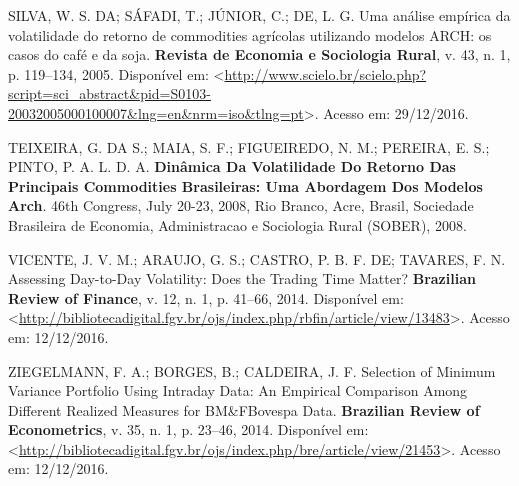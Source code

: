\documentclass[]{article}
\begin{document}
\hypertarget{ref-silva_uma_2005}{}
SILVA, W. S. DA; SÁFADI, T.; JÚNIOR, C.; DE, L. G. Uma análise empírica
da volatilidade do retorno de commodities agrícolas utilizando modelos
ARCH: os casos do café e da soja. \textbf{Revista de Economia e
Sociologia Rural}, v. 43, n. 1, p. 119--134, 2005. Disponível em:
\textless{}\url{http://www.scielo.br/scielo.php?script=sci_abstract\&pid=S0103-20032005000100007\&lng=en\&nrm=iso\&tlng=pt}\textgreater{}.
Acesso em: 29/12/2016.

\hypertarget{ref-teixeira_dinamica_2008}{}
TEIXEIRA, G. DA S.; MAIA, S. F.; FIGUEIREDO, N. M.; PEREIRA, E. S.;
PINTO, P. A. L. D. A. \textbf{Dinâmica Da Volatilidade Do Retorno Das
Principais Commodities Brasileiras: Uma Abordagem Dos Modelos Arch}.
46th Congress, July 20-23, 2008, Rio Branco, Acre, Brasil, Sociedade
Brasileira de Economia, Administracao e Sociologia Rural (SOBER), 2008.

\hypertarget{ref-vicente_assessing_2014}{}
VICENTE, J. V. M.; ARAUJO, G. S.; CASTRO, P. B. F. DE; TAVARES, F. N.
Assessing Day-to-Day Volatility: Does the Trading Time Matter?
\textbf{Brazilian Review of Finance}, v. 12, n. 1, p. 41--66, 2014.
Disponível em:
\textless{}\url{http://bibliotecadigital.fgv.br/ojs/index.php/rbfin/article/view/13483}\textgreater{}.
Acesso em: 12/12/2016.

\hypertarget{ref-ziegelmann_selection_2014}{}
ZIEGELMANN, F. A.; BORGES, B.; CALDEIRA, J. F. Selection of Minimum
Variance Portfolio Using Intraday Data: An Empirical Comparison Among
Different Realized Measures for BM\&FBovespa Data. \textbf{Brazilian
Review of Econometrics}, v. 35, n. 1, p. 23--46, 2014. Disponível em:
\textless{}\url{http://bibliotecadigital.fgv.br/ojs/index.php/bre/article/view/21453}\textgreater{}.
Acesso em: 12/12/2016.
\end{document}
